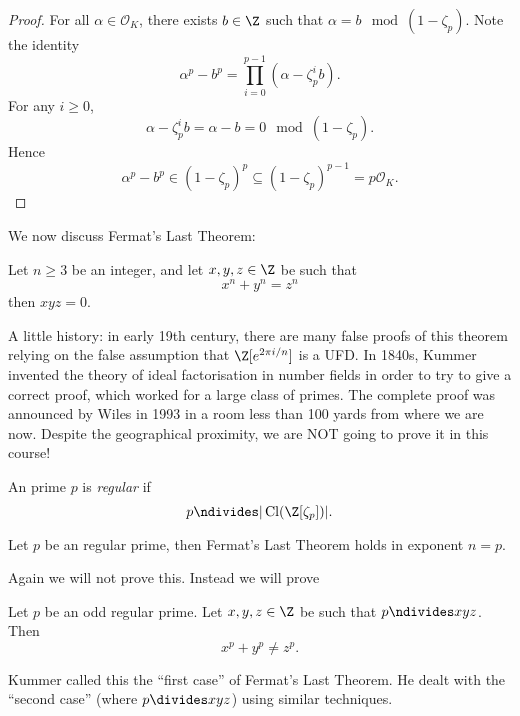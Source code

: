 \documentclass[a4paper]{article}
\renewcommand*{\O}{\mathcal{O}}
\DeclareMathOperator{\Cl}{Cl} %
\begin{document}
\begin{proof}
  For all \(\alpha \in \O_K\), there exists \(b \in \Z\) such that \(\alpha = b \mod{(1 - \zeta_p)}\). Note the identity
  \[
    \alpha^p - b^p = \prod_{i = 0}^{p - 1}(\alpha - \zeta_p^i b).
  \]
  For any \(i \geq 0\),
  \[
    \alpha - \zeta_p^i b = \alpha - b = 0 \mod{(1 - \zeta_p)}.
  \]
  Hence
  \[
    \alpha^p - b^p \in (1 - \zeta_p)^p \subseteq (1 - \zeta_p)^{p - 1} = p\O_K.
  \]
\end{proof}

We now discuss Fermat's Last Theorem:

\begin{theorem}[Wiles, 1994]
  Let \(n \geq 3\) be an integer, and let \(x, y, z \in \Z\) be such that
  \[
    x^n + y^n = z^n
  \]
  then \(xyz = 0\).
\end{theorem}

A little history: in early 19th century, there are many false proofs of this theorem relying on the false assumption that \(\Z[e^{2\pi i/n}]\) is a UFD. In 1840s, Kummer invented the theory of ideal factorisation in number fields in order to try to give a correct proof, which worked for a large class of primes. The complete proof was announced by Wiles in 1993 in a room less than 100 yards from where we are now. Despite the geographical proximity, we are NOT going to prove it in this course!

\begin{definition}
  An prime \(p\) is \emph{regular} if
  \[
    p \ndivides |\Cl(\Z[\zeta_p])|.
  \]
\end{definition}

\begin{theorem}[Kummer]
  Let \(p\) be an regular prime, then Fermat's Last Theorem holds in exponent \(n = p\).
\end{theorem}

Again we will not prove this. Instead we will prove

\begin{theorem}
  Let \(p\) be an odd regular prime. Let \(x, y, z \in \Z\) be such that \(p \ndivides xyz\). Then
  \[
    x^p + y^p \neq z^p.
  \]
\end{theorem}

Kummer called this the ``first case'' of Fermat's Last Theorem. He dealt with the ``second case'' (where \(p \divides xyz\)) using similar techniques.
\end{document}
